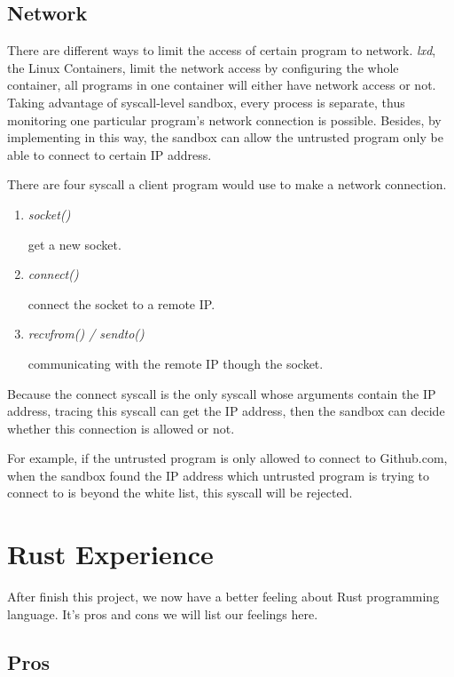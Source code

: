 \documentclass[conference,compsoc]{IEEEtran}
\begin{document}
		\subsection{Network}
			\par
				There are different ways to limit the access of certain program to network. 
				\emph{lxd}, the Linux Containers, limit the network access by configuring the whole container, all programs in one container will either have network access or not. 
				Taking advantage of syscall-level sandbox, every process is separate, thus monitoring one particular program's network connection is possible. 
				Besides, by implementing in this way, the sandbox can allow the untrusted program only be able to connect to certain IP address.
			\par
				There are four syscall a client program would use to make a network connection. 
			\begin{enumerate}
			\item \emph{ socket() }
				\par
				get a new socket.
			\item \emph{ connect() }
				\par
				connect the socket to a remote IP.
			\item \emph{ recvfrom() / sendto() }
				\par
				communicating with the remote IP though the socket.
			\end{enumerate}
			\par 
				Because the connect syscall is the only syscall whose arguments contain the IP address, tracing this syscall can get the IP address, then the sandbox can decide whether this connection is allowed or not. 
			\par
				For example, if the untrusted program is only allowed to connect to Github.com, when the sandbox found the IP address which untrusted program is trying to connect to is beyond the white list, this syscall will be rejected.
			

\section{Rust Experience}
	After finish this project, we now have a better feeling about Rust programming language. It's pros and cons we will list our feelings here.
	\subsection{Pros}
		\par
\end{document}
